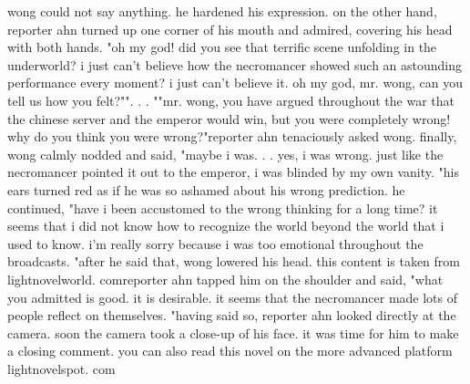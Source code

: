 wong could not say anything.
 he hardened his expression.
 on the other hand, reporter ahn turned up one corner of his mouth and admired, covering his head with both hands.
"oh my god! did you see that terrific scene unfolding in the underworld? i just can't believe how the necromancer showed such an astounding performance every moment? i just can't believe it.
 oh my god, mr.
 wong, can you tell us how you felt?"".
.
.
""mr.
 wong, you have argued throughout the war that the chinese server and the emperor would win, but you were completely wrong! why do you think you were wrong?"reporter ahn tenaciously asked wong.
 finally, wong calmly nodded and said, "maybe i was.
.
.
yes, i was wrong.
 just like the necromancer pointed it out to the emperor, i was blinded by my own vanity.
"his ears turned red as if he was so ashamed about his wrong prediction.
 he continued, "have i been accustomed to the wrong thinking for a long time? it seems that i did not know how to recognize the world beyond the world that i used to know.
 i'm really sorry because i was too emotional throughout the broadcasts.
"after he said that, wong lowered his head.
 this content is taken from lightnov‌elworld.
comreporter ahn tapped him on the shoulder and said, "what you admitted is good.
 it is desirable.
 it seems that the necromancer made lots of people reflect on themselves.
"having said so, reporter ahn looked directly at the camera.
soon the camera took a close-up of his face.
 it was time for him to make a closing comment.
 you can also read this novel on the more advanced platform lightnovelspot.
com

 